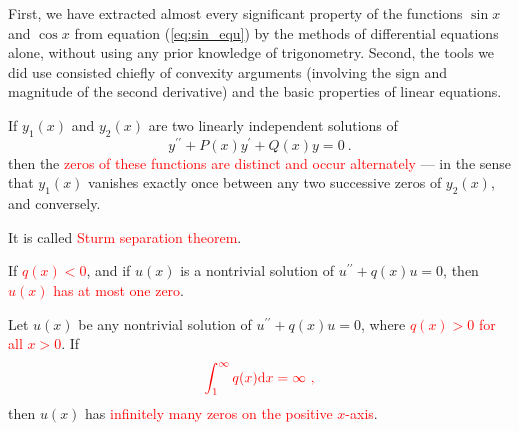 \documentclass[12pt,a4paper]{article}
\newcommand{\dif}{\mathrm{d}}
\newcounter{theo}[section]\setcounter{theo}{0}
\begin{document}
First, we have extracted almost every significant property of the functions $\sin x$ and $\cos x$ from equation (\ref{eq:sin_equ}) by the methods of differential equations alone, without using any prior knowledge of trigonometry. Second, the tools we did use consisted chiefly of convexity arguments (involving the sign and magnitude of the second derivative) and the basic properties of linear equations. 




\begin{tcolorbox}[colback=green!5,colframe=green!40!black,title= Theorem A]
If $y_1(x)$ and $y_2(x)$ are two linearly independent solutions of
\begin{equation}
y^{\prime \prime} +P(x) y^\prime +Q(x) y = 0 ~.
\end{equation}
then the \textcolor{red}{zeros of these functions are distinct and occur alternately} --- in the sense that $y_1(x)$ vanishes exactly once between any two successive zeros of $y_2(x)$, and conversely.
\end{tcolorbox}
It is called \textcolor{red}{Sturm separation theorem}.


\begin{tcolorbox}[colback=green!5,colframe=green!40!black,title= Theorem B]
If \textcolor{red}{$q(x) < 0$}, and if $u(x)$ is a nontrivial solution of $u^{\prime \prime} +q(x) u = 0$, then \textcolor{red}{$u(x)$ has at most one zero}.
\end{tcolorbox}


\begin{tcolorbox}[colback=green!5,colframe=green!40!black,title= Theorem C]
Let $u(x)$ be any nontrivial solution of $u^{\prime \prime}+q(x)u = 0$, where \textcolor{red}{$q(x) > 0$ for all $x > 0$}. If
\begin{equation}
\color{red} \int_1^\infty q(x) \dif x = \infty ~,
\end{equation}
then $u(x)$ has \textcolor{red}{infinitely many zeros on the positive $x$-axis}.
\end{tcolorbox}
\end{document}
